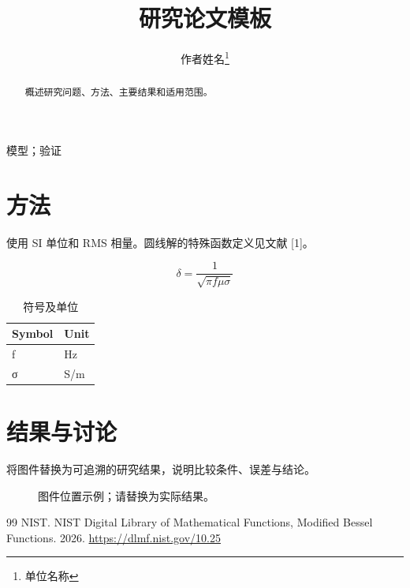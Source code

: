 \documentclass[journal,10pt]{IEEEtran}
\begin{document}
\title{研究论文模板}
\author{作者姓名\thanks{单位名称}}
\maketitle
\begin{abstract}
概述研究问题、方法、主要结果和适用范围。
\end{abstract}
\begin{IEEEkeywords}
模型；验证
\end{IEEEkeywords}
\section{方法}
\hypertarget{chapter-01}{}
使用 SI 单位和 RMS 相量。圆线解的特殊函数定义见文献 [1]。

\begin{equation}\delta=\frac{1}{\sqrt{\pi f\mu\sigma}}\label{eq:skin}\end{equation}
\begin{table}[!htbp]
\centering
\caption{符号及单位}
\begingroup\footnotesize
\begin{tabularx}{\textwidth}{>{\raggedright\arraybackslash}X>{\raggedright\arraybackslash}X}
\toprule
Symbol & Unit\\
\midrule
f & Hz\\
σ & S/m\\
\bottomrule
\end{tabularx}\endgroup
\end{table}
\section{结果与讨论}
\hypertarget{chapter-02}{}
将图件替换为可追溯的研究结果，说明比较条件、误差与结论。

\renewcommand{\refname}{参考文献}
\begin{figure}[!htbp]\centering\fbox{\rule{0pt}{22mm}\rule{.8\linewidth}{0pt}}\caption{图件位置示例；请替换为实际结果。}\label{fig:example}\end{figure}
\begin{thebibliography}{99}
 NIST. NIST Digital Library of Mathematical Functions, Modified Bessel Functions. 2026. \url{https://dlmf.nist.gov/10.25}
\end{thebibliography}
\end{document}
